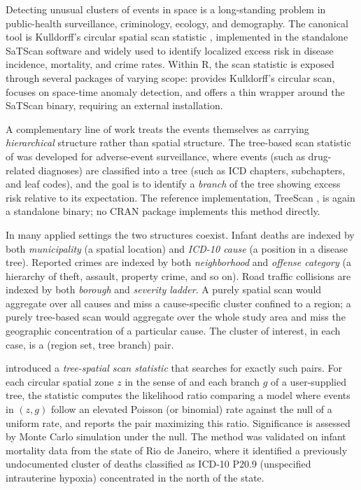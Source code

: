 Detecting unusual clusters of events in space is a long-standing problem in
public-health surveillance, criminology, ecology, and demography. The
canonical tool is Kulldorff's circular spatial scan statistic
\citep{kulldorff1995, kulldorff1997}, implemented in the standalone SaTScan
software \citep{satscan} and widely used to identify localized excess risk in
disease incidence, mortality, and crime rates. Within R, the scan statistic
is exposed through several packages of varying scope: 
\citep{spatialepi} provides Kulldorff's circular scan, 
\citep{scanstatistics} focuses on space-time anomaly detection, and
 \citep{rsatscan} offers a thin wrapper around the SaTScan
binary, requiring an external installation.

A complementary line of work treats the events themselves as carrying
\emph{hierarchical} structure rather than spatial structure. The tree-based scan
statistic of \citet{kulldorff2003} was developed for adverse-event surveillance,
where events (such as drug-related diagnoses) are classified into a tree
(such as ICD chapters, subchapters, and leaf codes), and the goal is to
identify a \emph{branch} of the tree showing excess risk relative to its
expectation. The reference implementation, TreeScan \citep{treescan}, is again a
standalone binary; no CRAN package implements this method directly.

In many applied settings the two structures coexist. Infant deaths are
indexed by both \emph{municipality} (a spatial location) and \emph{ICD-10 cause} (a
position in a disease tree). Reported crimes are indexed by both
\emph{neighborhood} and \emph{offense category} (a hierarchy of theft, assault,
property crime, and so on). Road traffic collisions are indexed by both
\emph{borough} and \emph{severity ladder}. A purely spatial scan would aggregate over
all causes and miss a cause-specific cluster confined to a region; a purely
tree-based scan would aggregate over the whole study area and miss the
geographic concentration of a particular cause. The cluster of interest, in
each case, is a (region set, tree branch) pair.

\citet{cancado2025} introduced a \emph{tree-spatial scan statistic} that searches for
exactly such pairs. For each circular spatial zone \(z\) in the sense of
\citet{kulldorff1997} and each branch \(g\) of a user-supplied tree, the statistic
computes the likelihood ratio comparing a model where events in \((z, g)\)
follow an elevated Poisson (or binomial) rate against the null of a uniform
rate, and reports the pair maximizing this ratio. Significance is assessed
by Monte Carlo simulation under the null. The method was validated on
infant mortality data from the state of Rio de Janeiro, where it identified
a previously undocumented cluster of deaths classified as ICD-10 P20.9
(unspecified intrauterine hypoxia) concentrated in the north of the state.

